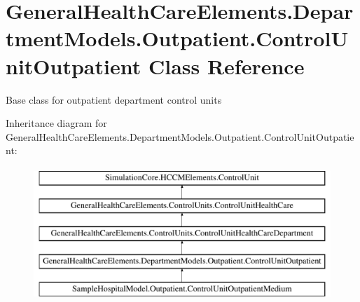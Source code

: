 \hypertarget{class_general_health_care_elements_1_1_department_models_1_1_outpatient_1_1_control_unit_outpatient}{}\section{General\+Health\+Care\+Elements.\+Department\+Models.\+Outpatient.\+Control\+Unit\+Outpatient Class Reference}
\label{class_general_health_care_elements_1_1_department_models_1_1_outpatient_1_1_control_unit_outpatient}


Base class for outpatient department control units  


Inheritance diagram for General\+Health\+Care\+Elements.\+Department\+Models.\+Outpatient.\+Control\+Unit\+Outpatient\+:\begin{figure}[H]
\begin{center}
\leavevmode
\includegraphics[height=5.000000cm]{class_general_health_care_elements_1_1_department_models_1_1_outpatient_1_1_control_unit_outpatient}
\end{center}
\end{figure}
